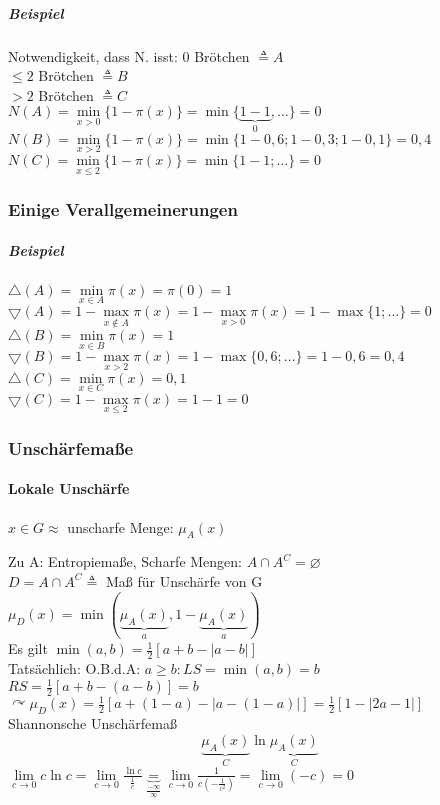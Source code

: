 \documentclass[a4paper]{scrartcl}
\begin{document}
\subparagraph{Beispiel} Notwendigkeit, dass N. isst:
$0$ Brötchen $\triangleq A$\\
$\leq 2$ Brötchen $\triangleq B$\\
$>2$ Brötchen $\triangleq C$\\
$N(A) = \min\limits_{x>0} \{ 1- \pi (x) \} = \min \{ \underbrace{1-1}_{0}, \dots \} = 0$\\
$N(B) = \min\limits_{x>2} \{ 1- \pi (x) \} = \min \{ 1-0,6;1-0,3; 1-0,1 \} = 0,4$\\
$N(C) = \min\limits_{x \leq 2} \{ 1- \pi (x) \} = \min \{1-1;\dots \} = 0$


\subsubsection{Einige Verallgemeinerungen}%

\subparagraph{Beispiel} $\bigtriangleup (A) = \min\limits_{x \in A} \pi (x) = \pi (0) =1$\\
$\bigtriangledown (A) = 1 - \max\limits_{x \notin A} \pi (x)  = 1- \max\limits_{x > 0} \pi (x) = 1- \max \{1;\dots\} = 0 $\\
$\bigtriangleup (B) = \min\limits_{x \in B} \pi (x) = 1$\\
$\bigtriangledown (B) = 1 - \max\limits_{x> 2} \pi (x) = 1 - \max \{ 0,6; \dots \} = 1-0,6 = 0,4$\\
$\bigtriangleup (C) = \min\limits_{x \in C} \pi (x) = 0,1$\\
$\bigtriangledown (C) = 1- \max\limits_{x \leq 2} \pi (x) = 1-1 = 0$\\

\subsubsection{Unschärfemaße}
\paragraph{Lokale Unschärfe} $x \in G \approx$ unscharfe Menge: $\mu_A (x)$

Zu A: Entropiemaße, Scharfe Mengen: $A \cap A^C = \varnothing$\\
$D = A \cap A^C \triangleq $ Maß für Unschärfe von G\\
$\mu_D (x) = \min ( \underbrace{\mu_A(x)}_{a}, 1- \underbrace{\mu_A(x)}_{a} )$\\
Es gilt $\min (a,b) = \frac{1}{2} [a + b - | a-b | ]$\\
Tatsächlich: O.B.d.A: $a \geq b : LS = \min (a,b) = b$\\
$RS= \frac{1}{2} [a+b - (a-b) ] = b$\\
$\curvearrowright \mu_D (x) = \frac{1}{2} [a+(1-a) - | a-(1-a) |] = \frac{1}{2} [1 - | 2a -1|]$\\
Shannonsche Unschärfemaß
\[ \underbrace{\mu_A (x)}_{C} \ln \underbrace{\mu_A(x)}_{C}\]
$\lim\limits_{c \to 0} c \ln c = \lim\limits_{c \to 0} \frac{\ln c}{\frac{1}{c}} \underbrace{=}_{\frac{-\infty}{\infty}} \lim\limits_{c \to 0} \frac{1}{c (- \frac{1}{c^2})} = \lim\limits_{c \to 0} (-c) = 0$\\
\end{document}
